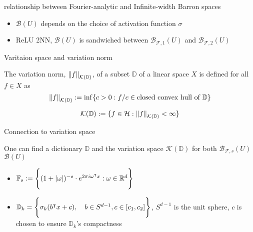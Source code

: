 \documentclass[aspectratio=32]{beamer}
\begin{document}
\begin{frame}{relationship between Fourier-analytic and Infinite-width Barron spaces}
    
    \begin{itemize}
        \item $\mathcal{B}(U)$ depends on the choice of activation function $\sigma$
        \item ReLU 2NN, $\mathcal{B}(U)$ is sandwiched between
        $\mathcal{B}_{\mathcal{F},1}(U)$ and $\mathcal{B}_{\mathcal{F},2}(U)$
    \end{itemize}
\end{frame}

\begin{frame}{Varitaion space and variation norm}
    
    \begin{definition}
        The variation norm, $\left\| f \right\|_{\mathcal{K}(\mathbb{D})}$, of a subset
        $\mathbb{D}$ of a linear space $X$ is defined for all $f \in X$ as
        \begin{equation*}
            \left\| f \right\|_{\mathcal{K}(\mathbb{D})} := \inf \{
                c > 0: f/c \in \textnormal{closed convex hull of } \mathbb{D}\}
        \end{equation*}
    \end{definition}

    \begin{definition}
        \begin{equation*}
            \mathcal{K}(\mathbb{D}) := \{
                f \in \mathcal{H}: \left\| f \right\|_{\mathcal{K}(\mathbb{D})} < \infty \}
        \end{equation*}
    \end{definition}
\end{frame}

\begin{frame}{Connection to variation space}

    One can find a dictionary $\mathbb{D}$ and the variation space
    $\mathcal{K}(\mathbb{D})$ for both 
    $\mathcal{B}_{\mathcal{F},s}(U)$
    $\mathcal{B}(U)$

    \begin{itemize}
        \item $\mathbb{F}_s := \Bigg\{ (1 + \left| \omega \right|)^{-s} \cdot e^{2\pi
            i\omega{}^{\intercal} x}: \omega \in \mathbb{R}^d \Bigg\}$
        \item $\mathbb{D}_{k} = \Bigg\{ \sigma_k(b{}^{\intercal} x + c), \quad b\in
            S^{d-1}, c\in [c_1, c_2] \Bigg\}$, $S^{d-1}$ is the unit sphere, $c$
            is chosen to ensure $\mathbb{D}_{k}$'s compactness
    \end{itemize}

\end{frame}
\end{document}
